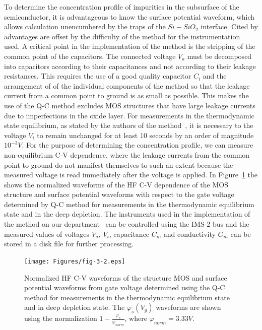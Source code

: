 To determine the concentration profile of impurities in the subsurface
of the semiconductor, it is advantageous to know the surface potential
waveform, which allows calculation unencumbered by the traps of the
$Si-SiO_2$ interface. Cited by advantages are offset by the difficulty
of the method for the instrumentation used.  A critical point in the
implementation of the method is the stripping of the common point of
the capacitors. The connected voltage $V_a$ must be decomposed into
capacitors according to their capacitances and not according to their
leakage resistances.  This requires the use of a good quality
capacitor $C_i$ and the arrangement of of the individual components of
the method so that the leakage current from a common point to ground
is as small as possible. This makes the use of the Q-C method excludes
MOS structures that have large leakage currents due to imperfections
in the oxide layer. For measurements in the thermodynamic state
equilibrium, as stated by the authors of the method~\cite{3.7}, it is
necessary to the voltage $V_i$ to remain unchanged for at least 10
seconds by an order of magnitude $10^{-3}V$. For the purpose of
determining the concentration profile, we can measure non-equilibrium
C-V dependence, where the leakage currents from the common point to
ground do not manifest themselves to such an extent because the
measured voltage is read immediately after the voltage is applied. In
Figure~\ref{fig:3.2} the shows the normalized waveforms of the HF C-V
dependence of the MOS structure and surface potential waveforms with
respect to the gate voltage determined by Q-C method for measurements
in the thermodynamic equilibrium state and in the deep depletion. The
instruments used in the implementation of the method on our
department~\cite{3.8,3.9} can be controlled using the IMS-2 bus and
the measured values of voltages $V_a$, $V_i$, capacitance $C_m$ and
conductivity $G_m$ can be stored in a disk file for further
processing.

\begin{figure}[h!]\centering
\texttt{[image: Figures/fig-3-2.eps]}
\caption[Normalized waveforms HF C-V dependence of MOS structure and waveform
  surface potential versus gate voltage determined using the Q-C method
  for measurements in thermodynamic equilibrium and deep
  depletion]{Normalized HF C-V waveforms of the structure
  MOS and surface potential waveforms from gate voltage determined
  using the Q-C method for measurements in the thermodynamic equilibrium state and in
  deep depletion state. The $\varphi_s(V_g)$ waveforms are shown
  using the normalization $1-\frac{\varphi_s}{\varphi_{norm}}$, where
  $\varphi_{norm}=3.33V$.}\label{fig:3.2}
\end{figure}

